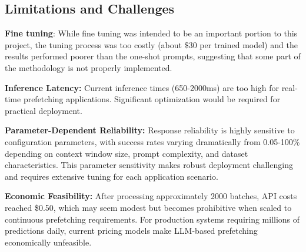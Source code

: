 \documentclass[sigconf,authorversion,nonacm]{acmart}
\begin{document}

% 
% 


\subsection{Limitations and Challenges}

\textbf{Fine tuning}: While fine tuning was intended to be an important portion to this project, the tuning process was too costly (about $\$30$ per trained model) and the results performed poorer than the one-shot prompts, suggesting that some part of the methodology is not properly implemented.

\textbf{Inference Latency:} Current inference times (650-2000ms) are too high for real-time prefetching applications. Significant optimization would be required for practical deployment.

\textbf{Parameter-Dependent Reliability:} Response reliability is highly sensitive to configuration parameters, with success rates varying dramatically from 0.05-100\% depending on context window size, prompt complexity, and dataset characteristics. This parameter sensitivity makes robust deployment challenging and requires extensive tuning for each application scenario.

\textbf{Economic Feasibility:} After processing approximately 2000 batches, API costs reached \$0.50, which may seem modest but becomes prohibitive when scaled to continuous prefetching requirements. For production systems requiring millions of predictions daily, current pricing models make LLM-based prefetching economically unfeasible.

\end{document}
